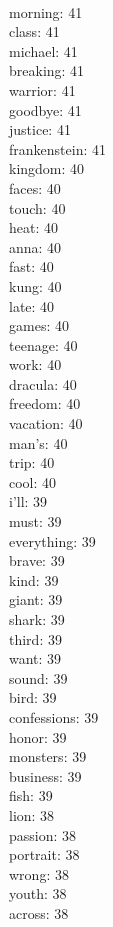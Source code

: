 \begin{multicols}{6}
  \\ morning: 41
  \\ class: 41
  \\ michael: 41
  \\ breaking: 41
  \\ warrior: 41
  \\ goodbye: 41
  \\ justice: 41
  \\ frankenstein: 41
  \\ kingdom: 40
  \\ faces: 40
  \\ touch: 40
  \\ heat: 40
  \\ anna: 40
  \\ fast: 40
  \\ kung: 40
  \\ late: 40
  \\ games: 40
  \\ teenage: 40
  \\ work: 40
  \\ dracula: 40
  \\ freedom: 40
  \\ vacation: 40
  \\ man's: 40
  \\ trip: 40
  \\ cool: 40
  \\ i'll: 39
  \\ must: 39
  \\ everything: 39
  \\ brave: 39
  \\ kind: 39
  \\ giant: 39
  \\ shark: 39
  \\ third: 39
  \\ want: 39
  \\ sound: 39
  \\ bird: 39
  \\ confessions: 39
  \\ honor: 39
  \\ monsters: 39
  \\ business: 39
  \\ fish: 39
  \\ lion: 38
  \\ passion: 38
  \\ portrait: 38
  \\ wrong: 38
  \\ youth: 38
  \\ across: 38

\end{multicols}
